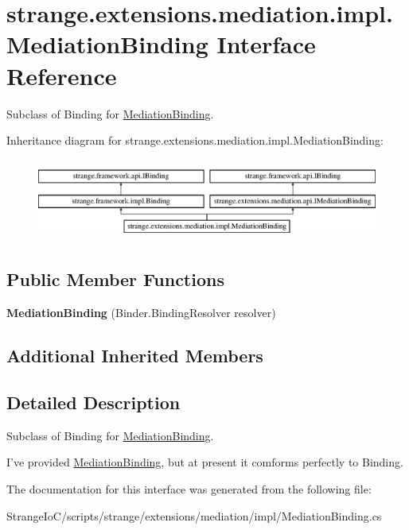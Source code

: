 \hypertarget{classstrange_1_1extensions_1_1mediation_1_1impl_1_1_mediation_binding}{\section{strange.\-extensions.\-mediation.\-impl.\-Mediation\-Binding Interface Reference}
\label{classstrange_1_1extensions_1_1mediation_1_1impl_1_1_mediation_binding}
}


Subclass of Binding for \hyperlink{classstrange_1_1extensions_1_1mediation_1_1impl_1_1_mediation_binding}{Mediation\-Binding}.  


Inheritance diagram for strange.\-extensions.\-mediation.\-impl.\-Mediation\-Binding\-:\begin{figure}[H]
\begin{center}
\leavevmode
\includegraphics[height=2.718446cm]{classstrange_1_1extensions_1_1mediation_1_1impl_1_1_mediation_binding}
\end{center}
\end{figure}
\subsection*{Public Member Functions}
\begin{DoxyCompactItemize}
\item 
\hypertarget{classstrange_1_1extensions_1_1mediation_1_1impl_1_1_mediation_binding_af9ec0b3b01c9f59c9fe21e55b736dc57}{{\bfseries Mediation\-Binding} (Binder.\-Binding\-Resolver resolver)}\label{classstrange_1_1extensions_1_1mediation_1_1impl_1_1_mediation_binding_af9ec0b3b01c9f59c9fe21e55b736dc57}

\end{DoxyCompactItemize}
\subsection*{Additional Inherited Members}


\subsection{Detailed Description}
Subclass of Binding for \hyperlink{classstrange_1_1extensions_1_1mediation_1_1impl_1_1_mediation_binding}{Mediation\-Binding}. 

I've provided \hyperlink{classstrange_1_1extensions_1_1mediation_1_1impl_1_1_mediation_binding}{Mediation\-Binding}, but at present it comforms perfectly to Binding. 

The documentation for this interface was generated from the following file\-:\begin{DoxyCompactItemize}
\item 
Strange\-Io\-C/scripts/strange/extensions/mediation/impl/Mediation\-Binding.\-cs\end{DoxyCompactItemize}
